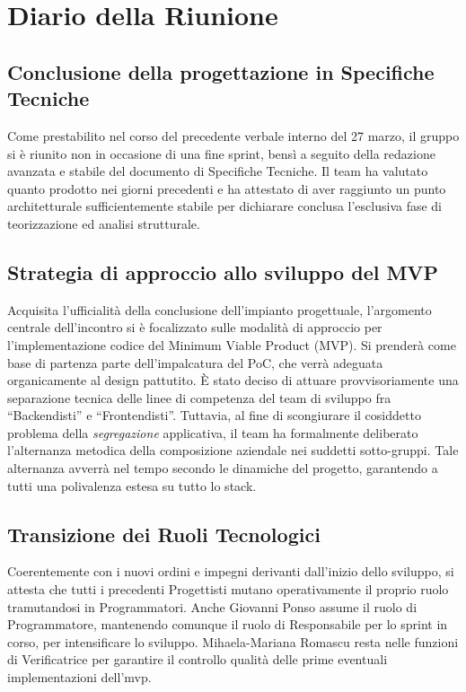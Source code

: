 \documentclass[a4paper, 11pt, oneside]{scrartcl} %
\begin{document}
\newpage
\section{Diario della Riunione}

\subsection{Conclusione della progettazione in Specifiche Tecniche}
Come prestabilito nel corso del precedente verbale interno del 27 marzo, il gruppo si è riunito non in occasione di una fine sprint, bensì a seguito della redazione avanzata e stabile del documento di Specifiche Tecniche. Il team ha valutato quanto prodotto nei giorni precedenti e ha attestato di aver raggiunto un punto architetturale sufficientemente stabile per dichiarare conclusa l'esclusiva fase di teorizzazione ed analisi strutturale.

\subsection{Strategia di approccio allo sviluppo del MVP}
Acquisita l'ufficialità della conclusione dell'impianto progettuale, l'argomento centrale dell'incontro si è focalizzato sulle modalità di approccio per l'implementazione codice del Minimum Viable Product (MVP). Si prenderà come base di partenza parte dell'impalcatura del PoC, che verrà adeguata organicamente al design pattutito.
È stato deciso di attuare provvisoriamente una separazione tecnica delle linee di competenza del team di sviluppo fra ``Backendisti'' e ``Frontendisti''. Tuttavia, al fine di scongiurare il cosiddetto problema della \emph{segregazione} applicativa, il team ha formalmente deliberato l'alternanza metodica della composizione aziendale nei suddetti sotto-gruppi. Tale alternanza avverrà nel tempo secondo le dinamiche del progetto, garantendo a tutti una polivalenza estesa su tutto lo stack.

\subsection{Transizione dei Ruoli Tecnologici}
Coerentemente con i nuovi ordini e impegni derivanti dall'inizio dello sviluppo, si attesta che tutti i precedenti Progettisti mutano operativamente il proprio ruolo tramutandosi in Programmatori. Anche
Giovanni Ponso assume il ruolo di Programmatore, mantenendo comunque il ruolo di Responsabile per lo sprint in corso, per intensificare lo sviluppo. Mihaela-Mariana Romascu resta nelle funzioni di Verificatrice per garantire il controllo qualità delle prime eventuali implementazioni dell'mvp.
\end{document}
